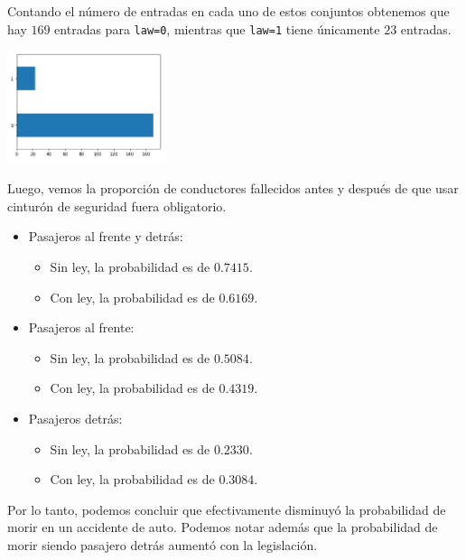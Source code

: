 \documentclass[letterpaper,11pt]{article}
\begin{document}
\begin{enumerate}
    Contando el número de entradas en cada uno de estos conjuntos obtenemos que 
    hay $169$ entradas para \texttt{law=0}, mientras que \texttt{law=1} tiene 
    únicamente $23$ entradas.
    \begin{center}
        \includegraphics[width=0.35\textwidth]{imagenes/seat2.png}
    \end{center}

    Luego, vemos la proporción de conductores fallecidos antes y después de que 
    usar cinturón de seguridad fuera obligatorio.
    \begin{itemize}
        \item Pasajeros al frente y detrás:
        \begin{itemize}
            \item Sin ley, la probabilidad es de $0.7415$.
            \item Con ley, la probabilidad es de $0.6169$.
        \end{itemize}

        \item Pasajeros al frente:
        \begin{itemize}
            \item Sin ley, la probabilidad es de $0.5084$.
            \item Con ley, la probabilidad es de $0.4319$.
        \end{itemize}

        \item Pasajeros detrás:
        \begin{itemize}
            \item Sin ley, la probabilidad es de $0.2330$.
            \item Con ley, la probabilidad es de $0.3084$.
        \end{itemize}
    \end{itemize}

    Por lo tanto, podemos concluir que efectivamente disminuyó la probabilidad 
    de morir en un accidente de auto. Podemos notar además que la probabilidad
    de morir siendo pasajero detrás aumentó con la legislación.


\end{enumerate}
\end{document}
